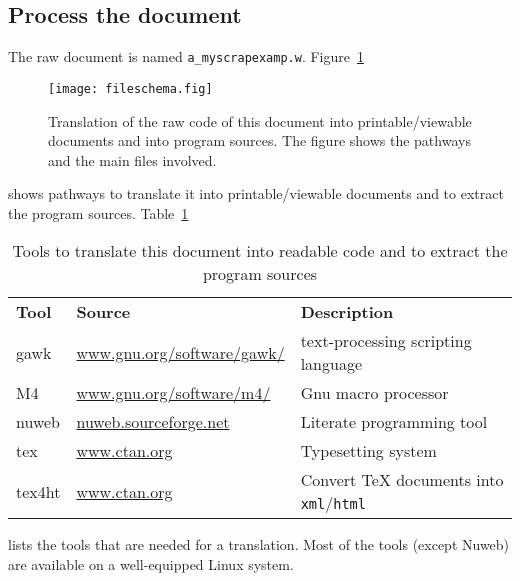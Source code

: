 \documentclass[twoside]{artikel3}
\begin{document}
\subsection{Process the document}
\label{sec:processing}

The raw document is named
\verb|a_myscrapexamp.w|. Figure~\ref{fig:fileschema}
\begin{figure}[hbtp]
  \centering
  \texttt{[image: fileschema.fig]}
  \caption{Translation of the raw code of this document into
    printable/viewable documents and into program sources. The figure
    shows the pathways and the main files involved.}
  \label{fig:fileschema}
\end{figure}
 shows pathways to
translate it into printable/viewable documents and to extract the
program sources. Table~\ref{tab:transtools}
\begin{table}[hbtp]
  \centering
  \begin{tabular}{lll}
    \textbf{Tool} & \textbf{Source} & \textbf{Description} \\
    gawk  & \url{www.gnu.org/software/gawk/}& text-processing scripting language \\
    M4    & \url{www.gnu.org/software/m4/}& Gnu macro processor \\
    nuweb & \url{nuweb.sourceforge.net} & Literate programming tool \\
    tex   & \url{www.ctan.org} & Typesetting system \\
    tex4ht & \url{www.ctan.org} & Convert \TeX{} documents into \texttt{xml}/\texttt{html}
  \end{tabular}
  \caption{Tools to translate this document into readable code and to
    extract the program sources}
  \label{tab:transtools}
\end{table}
lists the tools that are
needed for a translation. Most of the tools (except Nuweb) are available on a
well-equipped Linux system.
\end{document}
